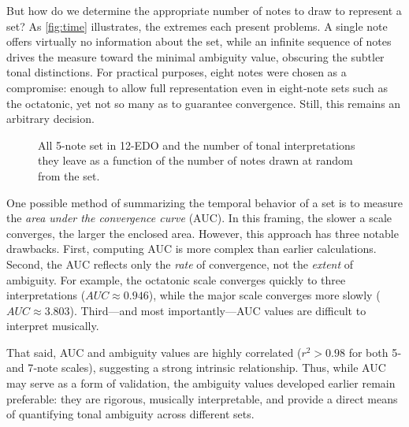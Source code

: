 \documentclass[10pt,twocolumn]{article}
\numberwithin{equation}{section} %
\begin{document}
    But how do we determine the appropriate number of notes to draw to represent a set?
    As \autoref{fig:time} illustrates, the extremes each present problems.
    A single note offers virtually no information about the set, while an infinite sequence of notes drives the measure toward the minimal ambiguity value, obscuring the subtler tonal distinctions.
    For practical purposes, eight notes were chosen as a compromise: enough to allow full representation even in eight‑note sets such as the octatonic, yet not so many as to guarantee convergence.
    Still, this remains an arbitrary decision.

    \begin{figure}[htbp]
        \centering
        \caption{All 5-note set in 12-EDO and the number of tonal interpretations they leave as a function of the number of notes drawn at random from the set.}
        \label{fig:time}
    \end{figure}

    One possible method of summarizing the temporal behavior of a set is to measure the \textit{area under the convergence curve} (AUC).
    In this framing, the slower a scale converges, the larger the enclosed area.
    However, this approach has three notable drawbacks.
    First, computing AUC is more complex than earlier calculations.
    Second, the AUC reflects only the \textit{rate} of convergence, not the \textit{extent} of ambiguity.
    For example, the octatonic scale converges quickly to three interpretations ($AUC \approx 0.946$), while the major scale converges more slowly ($AUC \approx 3.803$).
    Third—and most importantly—AUC values are difficult to interpret musically.

    That said, AUC and ambiguity values are highly correlated ($r^2 > 0.98$ for both 5‑ and 7‑note scales), suggesting a strong intrinsic relationship.
    Thus, while AUC may serve as a form of validation, the ambiguity values developed earlier remain preferable: they are rigorous, musically interpretable, and provide a direct means of quantifying tonal ambiguity across different sets.
\end{document}
